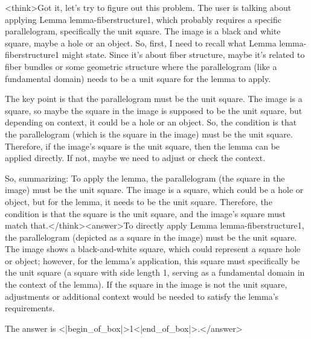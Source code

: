 <think>Got it, let's try to figure out this problem. The user is talking about applying Lemma lemma-fiberstructure1, which probably requires a specific parallelogram, specifically the unit square. The image is a black and white square, maybe a hole or an object. So, first, I need to recall what Lemma lemma-fiberstructure1 might state. Since it's about fiber structure, maybe it's related to fiber bundles or some geometric structure where the parallelogram (like a fundamental domain) needs to be a unit square for the lemma to apply. 

The key point is that the parallelogram must be the unit square. The image is a square, so maybe the square in the image is supposed to be the unit square, but depending on context, it could be a hole or an object. So, the condition is that the parallelogram (which is the square in the image) must be the unit square. Therefore, if the image's square is the unit square, then the lemma can be applied directly. If not, maybe we need to adjust or check the context. 

So, summarizing: To apply the lemma, the parallelogram (the square in the image) must be the unit square. The image is a square, which could be a hole or object, but for the lemma, it needs to be the unit square. Therefore, the condition is that the square is the unit square, and the image's square must match that.</think><answer>To directly apply Lemma lemma-fiberstructure1, the parallelogram (depicted as a square in the image) must be the unit square. The image shows a black-and-white square, which could represent a square hole or object; however, for the lemma’s application, this square must specifically be the unit square (a square with side length 1, serving as a fundamental domain in the context of the lemma). If the square in the image is not the unit square, adjustments or additional context would be needed to satisfy the lemma’s requirements.  

The answer is <|begin_of_box|>1<|end_of_box|>.</answer>